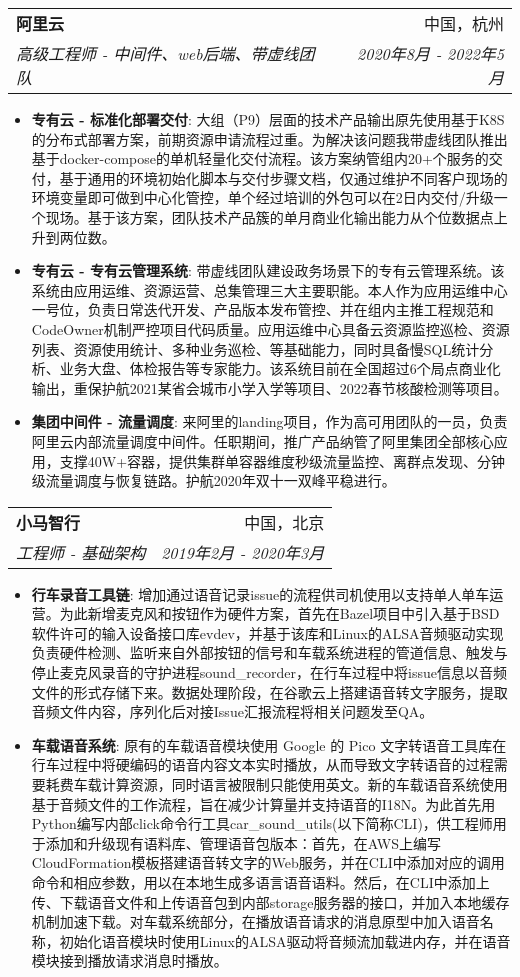 \documentclass[letterpaper,11pt]{article}
\makeatletter
\newcommand{\resumeItem}[2]{
	\item\small{
		\textbf{#1}{: #2 \vspace{-2pt}}
	}
}
\newcommand{\resumeSubheading}[4]{
	\vspace{-1pt}\item
	\begin{tabular*}{0.97\textwidth}[t]{l@{\extracolsep{\fill}}r}
		\textbf{#1} & #2 \\
		\textit{\small#3} & \textit{\small #4} \\
	\end{tabular*}\vspace{-5pt}
}
\newcommand{\resumeItemListStart}{\begin{itemize}}
\newcommand{\resumeItemListEnd}{\end{itemize}\vspace{-5pt}}
\makeatother
\begin{document}
\begin{spacing}{0.94}
		\resumeSubheading
		{阿里云}{中国，杭州}
		{高级工程师 - 中间件、web后端、带虚线团队}{2020年8月 - 2022年5月}
		\resumeItemListStart
		\resumeItem{专有云 - 标准化部署交付}
		{大组（P9）层面的技术产品输出原先使用基于K8S的分布式部署方案，前期资源申请流程过重。为解决该问题我带虚线团队推出基于docker-compose的单机轻量化交付流程。该方案纳管组内20+个服务的交付，基于通用的环境初始化脚本与交付步骤文档，仅通过维护不同客户现场的环境变量即可做到中心化管控，单个经过培训的外包可以在2日内交付/升级一个现场。基于该方案，团队技术产品簇的单月商业化输出能力从个位数据点上升到两位数。}
		\resumeItem{专有云 - 专有云管理系统}
		{带虚线团队建设政务场景下的专有云管理系统。该系统由应用运维、资源运营、总集管理三大主要职能。本人作为应用运维中心一号位，负责日常迭代开发、产品版本发布管控、并在组内主推工程规范和CodeOwner机制严控项目代码质量。应用运维中心具备云资源监控巡检、资源列表、资源使用统计、多种业务巡检、等基础能力，同时具备慢SQL统计分析、业务大盘、体检报告等专家能力。该系统目前在全国超过6个局点商业化输出，重保护航2021某省会城市小学入学等项目、2022春节核酸检测等项目。}
		\resumeItem{集团中间件 - 流量调度}
		{来阿里的landing项目，作为高可用团队的一员，负责阿里云内部流量调度中间件。任职期间，推广产品纳管了阿里集团全部核心应用，支撑40W+容器，提供集群单容器维度秒级流量监控、离群点发现、分钟级流量调度与恢复链路。护航2020年双十一双峰平稳进行。}
		\resumeItemListEnd
		
		\resumeSubheading
		{小马智行}{中国，北京}
		{工程师 - 基础架构}{2019年2月 - 2020年3月}
		\resumeItemListStart
		\resumeItem{行车录音工具链}
		{增加通过语音记录issue的流程供司机使用以支持单人单车运营。为此新增麦克风和按钮作为硬件方案，首先在Bazel项目中引入基于BSD软件许可的输入设备接口库evdev，并基于该库和Linux的ALSA音频驱动实现负责硬件检测、监听来自外部按钮的信号和车载系统进程的管道信息、触发与停止麦克风录音的守护进程sound\_recorder，在行车过程中将issue信息以音频文件的形式存储下来。数据处理阶段，在谷歌云上搭建语音转文字服务，提取音频文件内容，序列化后对接Issue汇报流程将相关问题发至QA。}
		\resumeItem{车载语音系统}
		{原有的车载语音模块使用 Google 的 Pico 文字转语音工具库在行车过程中将硬编码的语音内容文本实时播放，从而导致文字转语音的过程需要耗费车载计算资源，同时语言被限制只能使用英文。新的车载语音系统使用基于音频文件的工作流程，旨在减少计算量并支持语音的I18N。为此首先用Python编写内部click命令行工具car\_sound\_utils(以下简称CLI)，供工程师用于添加和升级现有语料库、管理语音包版本：首先，在AWS上编写CloudFormation模板搭建语音转文字的Web服务，并在CLI中添加对应的调用命令和相应参数，用以在本地生成多语言语音语料。然后，在CLI中添加上传、下载语音文件和上传语音包到内部storage服务器的接口，并加入本地缓存机制加速下载。对车载系统部分，在播放语音请求的消息原型中加入语音名称，初始化语音模块时使用Linux的ALSA驱动将音频流加载进内存，并在语音模块接到播放请求消息时播放。}
		\resumeItemListEnd
		

\end{spacing}
\end{document}
